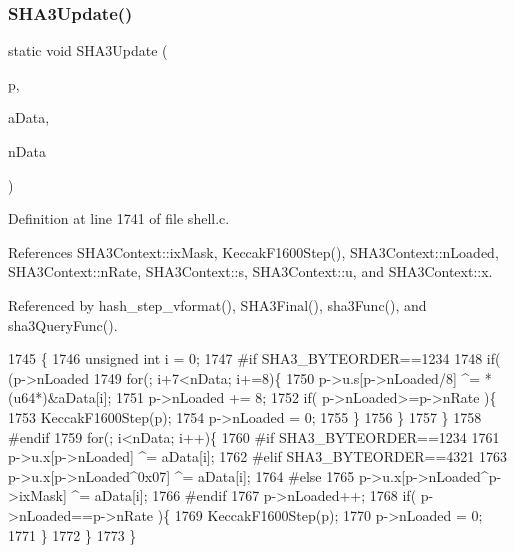 \subsubsection{S\+H\+A3\+Update()}
{\footnotesize\ttfamily static void S\+H\+A3\+Update (\begin{DoxyParamCaption}\item[{\textbf{ S\+H\+A3\+Context} $\ast$}]{p,  }\item[{const unsigned char $\ast$}]{a\+Data,  }\item[{unsigned int}]{n\+Data }\end{DoxyParamCaption})\hspace{0.3cm}{\ttfamily [static]}}



Definition at line 1741 of file shell.\+c.



References S\+H\+A3\+Context\+::ix\+Mask, Keccak\+F1600\+Step(), S\+H\+A3\+Context\+::n\+Loaded, S\+H\+A3\+Context\+::n\+Rate, S\+H\+A3\+Context\+::s, S\+H\+A3\+Context\+::u, and S\+H\+A3\+Context\+::x.



Referenced by hash\+\_\+step\+\_\+vformat(), S\+H\+A3\+Final(), sha3\+Func(), and sha3\+Query\+Func().


\begin{DoxyCode}
1745  \{
1746   \textcolor{keywordtype}{unsigned} \textcolor{keywordtype}{int} i = 0;
1747 \textcolor{preprocessor}{#if SHA3\_BYTEORDER==1234}
1748   \textcolor{keywordflow}{if}( (p->nLoaded %
1749     \textcolor{keywordflow}{for}(; i+7<nData; i+=8)\{
1750       p->u.s[p->nLoaded/8] ^= *(u64*)&aData[i];
1751       p->nLoaded += 8;
1752       \textcolor{keywordflow}{if}( p->nLoaded>=p->nRate )\{
1753         KeccakF1600Step(p);
1754         p->nLoaded = 0;
1755       \}
1756     \}
1757   \}
1758 \textcolor{preprocessor}{#endif}
1759   \textcolor{keywordflow}{for}(; i<nData; i++)\{
1760 \textcolor{preprocessor}{#if SHA3\_BYTEORDER==1234}
1761     p->u.x[p->nLoaded] ^= aData[i];
1762 \textcolor{preprocessor}{#elif SHA3\_BYTEORDER==4321}
1763     p->u.x[p->nLoaded^0x07] ^= aData[i];
1764 \textcolor{preprocessor}{#else}
1765     p->u.x[p->nLoaded^p->ixMask] ^= aData[i];
1766 \textcolor{preprocessor}{#endif}
1767     p->nLoaded++;
1768     \textcolor{keywordflow}{if}( p->nLoaded==p->nRate )\{
1769       KeccakF1600Step(p);
1770       p->nLoaded = 0;
1771     \}
1772   \}
1773 \}
\end{DoxyCode}
\mbox{\label{shell_8c_ab7f3ddba1172313cbb23a09f1cb48edd}} 

